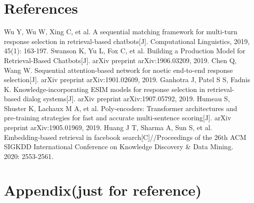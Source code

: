 \documentclass{beamer}
\begin{document}
\section{References}

\begin{frame}[allowframebreaks]
    
    \tiny
    
    \begin{thebibliography}{10} 
     Wu Y, Wu W, Xing C, et al. A sequential matching framework for multi-turn response selection in retrieval-based chatbots[J]. Computational Linguistics, 2019, 45(1): 163-197.
     Swanson K, Yu L, Fox C, et al. Building a Production Model for Retrieval-Based Chatbots[J]. arXiv preprint arXiv:1906.03209, 2019. 
     Chen Q, Wang W. Sequential attention-based network for noetic end-to-end response selection[J]. arXiv preprint arXiv:1901.02609, 2019.
     Ganhotra J, Patel S S, Fadnis K. Knowledge-incorporating ESIM models for response selection in retrieval-based dialog systems[J]. arXiv preprint arXiv:1907.05792, 2019.
     Humeau S, Shuster K, Lachaux M A, et al. Poly-encoders: Transformer architectures and pre-training strategies for fast and accurate multi-sentence scoring[J]. arXiv preprint arXiv:1905.01969, 2019.
     Huang J T, Sharma A, Sun S, et al. Embedding-based retrieval in facebook search[C]//Proceedings of the 26th ACM SIGKDD International Conference on Knowledge Discovery & Data Mining. 2020: 2553-2561.
    \end{thebibliography}
\end{frame}

\section{Appendix(just for reference)}
\end{document}
